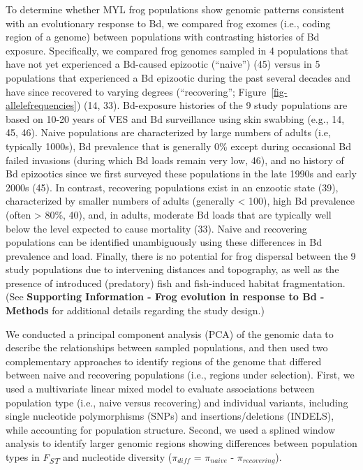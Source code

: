 \documentclass[9pt,twocolumn,twoside,lineno]{pnas-new}
\begin{document}
To determine whether MYL frog populations show genomic patterns
consistent with an evolutionary response to Bd, we compared frog exomes
(i.e., coding region of a genome) between populations with contrasting
histories of Bd exposure. Specifically, we compared frog genomes sampled
in 4 populations that have not yet experienced a Bd-caused epizootic
(``naive'') (45) versus in 5 populations that experienced a Bd epizootic
during the past several decades and have since recovered to varying
degrees (``recovering''; Figure~\ref{fig-allelefrequencies}) (14, 33).
Bd-exposure histories of the 9 study populations are based on 10-20
years of VES and Bd surveillance using skin swabbing (e.g., 14, 45, 46).
Naive populations are characterized by large numbers of adults (i.e,
typically 1000s), Bd prevalence that is generally 0\% except during
occasional Bd failed invasions (during which Bd loads remain very low,
46), and no history of Bd epizootics since we first surveyed these
populations in the late 1990s and early 2000s (45). In contrast,
recovering populations exist in an enzootic state (39), characterized by
smaller numbers of adults (generally \textless{} 100), high Bd
prevalence (often \textgreater{} 80\%, 40), and, in adults, moderate Bd
loads that are typically well below the level expected to cause
mortality (33). Naive and recovering populations can be identified
unambiguously using these differences in Bd prevalence and load.
Finally, there is no potential for frog dispersal between the 9 study
populations due to intervening distances and topography, as well as the
presence of introduced (predatory) fish and fish-induced habitat
fragmentation. (See \textbf{Supporting Information - Frog evolution in
response to Bd - Methods} for additional details regarding the study
design.)

We conducted a principal component analysis (PCA) of the genomic data to
describe the relationships between sampled populations, and then used
two complementary approaches to identify regions of the genome that
differed between naive and recovering populations (i.e., regions under
selection). First, we used a multivariate linear mixed model to evaluate
associations between population type (i.e., naive versus recovering) and
individual variants, including single nucleotide polymorphisms (SNPs)
and insertions/deletions (INDELS), while accounting for population
structure. Second, we used a splined window analysis to identify larger
genomic regions showing differences between population types in
\emph{F\textsubscript{ST}} and nucleotide diversity (\(\pi_{diff}\) =
\(\pi_{naive}\) - \(\pi_{recovering}\)).
\end{document}
